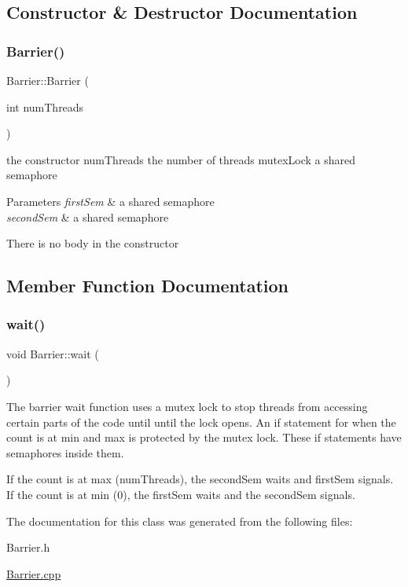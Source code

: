 \subsection{Constructor \& Destructor Documentation}
\mbox{\label{class_barrier_a7290fb8952d0f7779b8d6a7a34bbd407}} 
\subsubsection{\texorpdfstring{Barrier()}{Barrier()}}
{\footnotesize\ttfamily Barrier\+::\+Barrier (\begin{DoxyParamCaption}\item[{int}]{num\+Threads }\end{DoxyParamCaption})}



the constructor  num\+Threads the number of threads  mutex\+Lock a shared semaphore 


\begin{DoxyParams}{Parameters}
{\em first\+Sem} & a shared semaphore \\
\hline
{\em second\+Sem} & a shared semaphore\\
\hline
\end{DoxyParams}
There is no body in the constructor 

\subsection{Member Function Documentation}
\mbox{\label{class_barrier_a83a9d2e85e98b3d2081538bf0da29b60}} 
\subsubsection{\texorpdfstring{wait()}{wait()}}
{\footnotesize\ttfamily void Barrier\+::wait (\begin{DoxyParamCaption}{ }\end{DoxyParamCaption})}



The barrier wait function uses a mutex lock to stop threads from accessing certain parts of the code until until the lock opens. An if statement for when the count is at min and max is protected by the mutex lock. These if statements have semaphores inside them. 

If the count is at max (num\+Threads), the second\+Sem waits and first\+Sem signals. If the count is at min (0), the first\+Sem waits and the second\+Sem signals. 

The documentation for this class was generated from the following files\+:\begin{DoxyCompactItemize}
\item 
Barrier.\+h\item 
\hyperlink{_barrier_8cpp}{Barrier.\+cpp}\end{DoxyCompactItemize}
